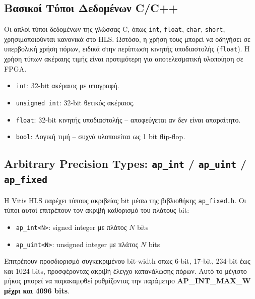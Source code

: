 \subsection{Βασικοί Τύποι Δεδομένων C/C++}
Οι απλοί τύποι δεδομένων της γλώσσας C, όπως \texttt{int}, \texttt{float}, \texttt{char}, \texttt{short}, χρησιμοποιούνται κανονικά στο HLS. Ωστόσο, η χρήση τους μπορεί να οδηγήσει σε υπερβολική χρήση πόρων, ειδικά στην περίπτωση κινητής υποδιαστολής (\texttt{float}). Η χρήση τύπων ακέραιης τιμής είναι προτιμότερη για αποτελεσματική υλοποίηση σε FPGA.

\begin{itemize}
  \item \texttt{int}: 32-bit ακέραιος με υπογραφή.
  \item \texttt{unsigned int}: 32-bit θετικός ακέραιος.
  \item \texttt{float}: 32-bit κινητής υποδιαστολής – αποφεύγεται αν δεν είναι απαραίτητο.
  \item \texttt{bool}: Λογική τιμή – συχνά υλοποιείται ως 1 bit flip-flop.
\end{itemize}

\subsection{Arbitrary Precision Types: \texttt{ap\_int} / \texttt{ap\_uint} / \texttt{ap\_fixed}}
Η Vitis HLS παρέχει τύπους ακριβείας bit μέσω της βιβλιοθήκης \texttt{ap\_fixed.h}. Οι τύποι αυτοί επιτρέπουν τον ακριβή καθορισμό του πλάτους bit:

\begin{itemize}
  \item \texttt{ap\_int<N>}: signed integer με πλάτος \(N\) bits  
  \item \texttt{ap\_uint<N>}: unsigned integer με πλάτος \(N\) bits  
\end{itemize}

Επιτρέπουν προσδιορισμό συγκεκριμένου bit-width οπως 6-bit, 17-bit, 234-bit έως και 1024 bits, προσφέροντας ακριβή έλεγχο κατανάλωσης πόρων.
Αυτό το μέγιστο μήκος μπορεί να παρακαμφθεί ρυθμίζοντας την παράμετρο \textbf{AP\_INT\_MAX\_W μέχρι και 4096 bits}.

